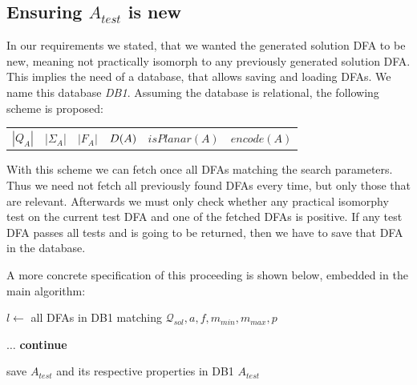 \subsection{Ensuring $A_{test}$ is new}

In our requirements we stated, that we wanted the generated solution DFA to be new, meaning not practically isomorph to any previously generated solution DFA. This implies the need of a database, that allows saving and loading DFAs. We name this database \emph{DB1}. Assuming the database is relational, the following scheme is proposed:
\begin{center}
	\begin{tabular}{c c c c c c}
	$|Q_A|$ & |$\Sigma_A$| & $|F_A|$ & $D(A)$ & $isPlanar(A)$ & $encode(A)$
	\end{tabular}
\end{center}
With this scheme we can fetch once all DFAs matching the search parameters. Thus we need not fetch all previously found DFAs every time, but only those that are relevant. Afterwards we must only check whether any practical isomorphy test on the current test DFA and one of the fetched DFAs is positive. If any test DFA passes all tests and is going to be returned, then we have to save that DFA in the database.

A more concrete specification of this proceeding is shown below, embedded in the main algorithm:
\vspace{0.2cm}
\begin{algorithmic}[1]
	
		\vspace{0.2cm}
	
		\State $l \gets$ all DFAs in DB1 matching $\mathcal{Q}_{sol}, a, f, m_{min}, m_{max}, p$
		
		\vspace{0.2cm}
		
		
		\vspace{0.2cm}
		
			\State $\ldots$
				\State \textbf{continue}
			\EndIf
			
			\vspace{0.2cm}
			
			\State save $A_{test}$ and its respective properties in DB1
			\State\Return $A_{test}$
		\EndWhile
	\EndFunction
\end{algorithmic}
\vspace{0.2cm}

